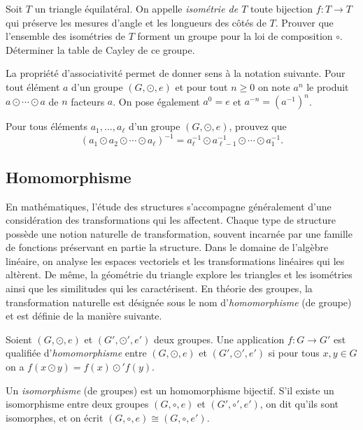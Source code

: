 \documentclass[french,course,oneside,theoremnosection]{lecture}
\begin{document}
\begin{exercise}
Soit $T$ un triangle équilatéral. On appelle \emph{isométrie de $T$} toute bijection $f\colon T \to T$ qui préserve les mesures d'angle et les longueurs des côtés de $T$. Prouver que l'ensemble des isométries de $T$ forment un groupe pour la loi de composition $\circ$. Déterminer la table de Cayley de ce groupe.
\end{exercise}

\begin{notation}
La propriété d'associativité permet de donner sens à la notation suivante. Pour tout élément $a$ d'un groupe $(G, \odot,  e)$ et pour tout $n\geq 0$ on note $a^n$ le produit $a \odot \cdots \odot a$ de $n$ facteurs $a$. On pose également $a^0=e$ et $a^{-n}=(a^{-1})^n$.
\end{notation}

\begin{exercise}
Pour tous éléments $a_1, \ldots, a_\ell$ d'un groupe $(G, \odot, e)$, prouvez que 
\[
(a_1\odot a_2\odot \cdots \odot a_\ell)^{-1} = a_\ell^{-1}\odot a_{\ell-1}^{-1}\odot \cdots \odot a_1^{-1}.
\]
\end{exercise}

\subsection{Homomorphisme}

En mathématiques, l'étude des structures s'accompagne généralement d'une considération des transformations qui les affectent. Chaque type de structure possède une notion naturelle de transformation, souvent incarnée par une famille de fonctions préservant en partie la structure. Dans le domaine de l'algèbre linéaire, on analyse les espaces vectoriels et les transformations linéaires qui les altèrent. De même, la géométrie du triangle explore les triangles et les isométries ainsi que les similitudes qui les caractérisent. En théorie des groupes, la transformation naturelle est désignée sous le nom d'\emph{homomorphisme} (de groupe) et est définie de la manière suivante.

\begin{definition} Soient $(G,\odot, e)$ et $(G', \odot', e')$ deux groupes.
Une application $f\colon G \to G'$ est qualifiée d'\emph{homomorphisme} entre $(G,\odot, e)$ et $(G', \odot',  e')$ si pour tous $x, y \in G$ on a $f(x\odot y)=f(x) \odot' f(y)$. 

Un \emph{isomorphisme} (de groupes) est un homomorphisme bijectif. S'il existe un isomorphisme entre deux groupes $(G, \circ, e)$ et $(G', \circ', e')$, on dit qu'ils sont isomorphes, et on écrit $(G, \circ, e) \cong (G, \circ, e')$.
\end{definition}
\end{document}
